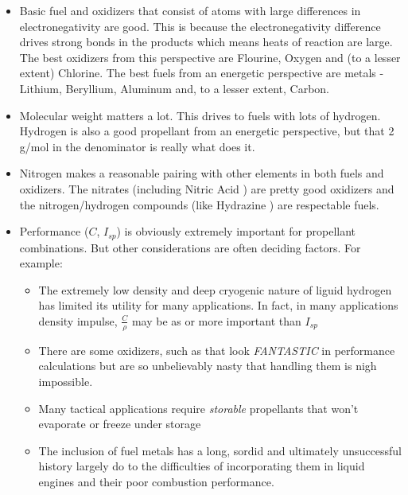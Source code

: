 \documentclass[twocolumn]{memoir} %
\begin{document}
\begin{itemize}
    \item Basic fuel and oxidizers that consist of atoms with large differences in
        electronegativity are good.  This is because the electronegativity difference
        drives strong bonds in the products which means heats of reaction are large.
        The best oxidizers from this perspective are Flourine, Oxygen and (to a lesser
        extent) Chlorine.  The best fuels from an energetic perspective are metals - 
        Lithium, Beryllium, Aluminum and, to a lesser extent, Carbon.
    \item Molecular weight matters a lot.  This drives to fuels with lots of hydrogen.
        Hydrogen is also a good propellant from an energetic perspective, but that 
        2 g/mol in the denominator is really what does it.
    \item Nitrogen makes a reasonable pairing with other elements in both fuels and
        oxidizers.  The nitrates (including Nitric Acid ) are pretty good
        oxidizers and the nitrogen/hydrogen compounds (like Hydrazine ) are
        respectable fuels.
    \item Performance ($C$, $I_{sp}$) is obviously extremely important for propellant
        combinations.  But other considerations are often deciding factors.  For
        example:
        \begin{itemize}
            \item The extremely low density and deep cryogenic nature of liguid hydrogen 
                has limited its utility for many applications.  In fact, in many applications
                density impulse, $\frac{C}{\rho}$ may be as or more important than $I_{sp}$
            \item There are some oxidizers, such as  that look \emph{FANTASTIC}
                in performance calculations but are so unbelievably nasty that handling
                them is nigh impossible.
            \item Many tactical applications require \emph{storable} propellants that
                won't evaporate or freeze under storage
            \item The inclusion of fuel metals has a long, sordid and ultimately 
                unsuccessful history largely do to the difficulties of incorporating
                them in liquid engines and their poor combustion performance.
        \end{itemize}
    
\end{itemize}
\end{document}
